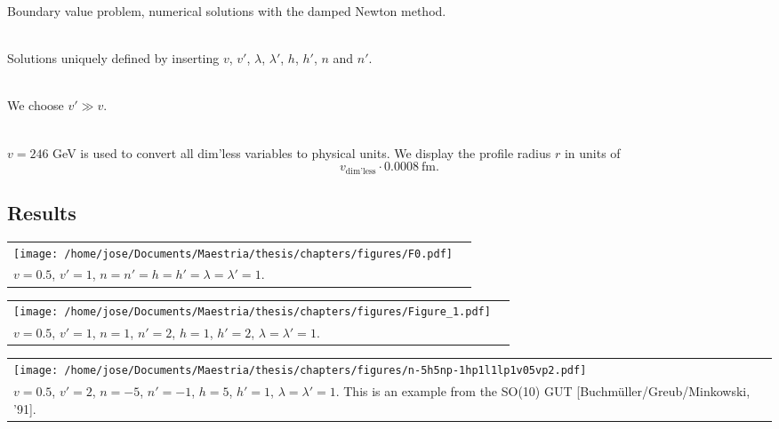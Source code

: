 \documentclass[14pt]{beamer}
\begin{document}
\begin{frame}

Boundary value problem, numerical solutions with the damped Newton method.\\~\

Solutions uniquely defined by inserting $v$, $v'$, $\lambda$, $\lambda'$, $h$, $h'$, $n$ and $n'$.\\~\

We choose $v'\gg v$. \\~\

$v=246$ GeV is used to convert all dim'less variables to physical units. 
We display the profile radius $r$ in units of  
\begin{equation*}
	 v_{\text{dim'less}}\cdot 0.0008\ \text{fm}.
\end{equation*}

\end{frame}

\subsection{Results}


\begin{frame}
\begin{tabular}{@{} *{2}{C{\linewidth}} }
  \texttt{[image: /home/jose/Documents/Maestria/thesis/chapters/figures/F0.pdf]} \\[\abovecaptionskip]
$v=0.5$, $v'=1$, $n=n'=h=h'=\lambda=\lambda'=1$.
\end{tabular}
\end{frame}

\begin{frame}
\begin{tabular}{@{} *{2}{C{\linewidth}} }
  \texttt{[image: /home/jose/Documents/Maestria/thesis/chapters/figures/Figure\_1.pdf]} \\[\abovecaptionskip]
$v = 0.5$, $v'=1$, $n=1$, $n'=2$, $h=1$, $h'=2$, $\lambda=\lambda'=1$.
\end{tabular}
\end{frame}

\begin{frame}
\begin{tabular}{@{} *{2}{C{\linewidth}} }
\texttt{[image: /home/jose/Documents/Maestria/thesis/chapters/figures/n-5h5np-1hp1l1lp1v05vp2.pdf]} \\[\abovecaptionskip]
$v = 0.5$, $v'=2$, $n=-5$, $n'=-1$, $h=5$, $h'=1$, $\lambda=\lambda'=1$. This is an example from the SO(10) GUT [Buchm\"uller/Greub/Minkowski, '91].
\end{tabular}
\end{frame}
\end{document}
